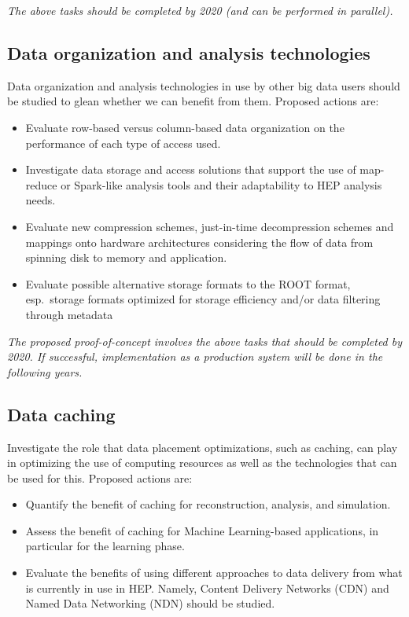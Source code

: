 \documentclass[12pt,a4paper]{article}
\begin{document}
\emph{The above tasks should be completed by 2020 (and can be performed in parallel).}

\subsection{Data organization and analysis
technologies}\label{data-organization-and-analysis}
Data organization and analysis technologies in use by other big data users should be studied
to glean whether we can benefit from them. Proposed actions are:

\begin{itemize}
\item Evaluate row-based versus column-based
  data organization on the performance of each type of access used.
\item Investigate data storage and access solutions that support the use of map-reduce or
Spark-like analysis tools and their adaptability to HEP analysis needs.
\item Evaluate new compression schemes, just-in-time
  decompression schemes and mappings onto hardware architectures
  considering the flow of data from spinning disk to memory and
  application.
\item Evaluate possible alternative storage formats to the ROOT format, esp.\ storage formats optimized for storage efficiency and/or  data filtering through metadata
\end{itemize}

\emph{The proposed proof-of-concept involves the above tasks that should be completed by 2020.
If successful, implementation as a production system will be done in the following years.}

\subsection{Data caching}\label{data-caching}
Investigate the role that data placement optimizations, such as caching, can play in optimizing
the use of computing resources as well as the technologies that can be used for this. Proposed actions are:

\begin{itemize}
\item Quantify the benefit of caching for reconstruction, analysis, and simulation.
\item Assess the benefit of caching for
  Machine Learning-based applications, in particular for the learning
  phase.
\item Evaluate the benefits of using different approaches to data delivery from what is currently in use in HEP.
Namely, Content Delivery Networks (CDN) and Named Data Networking (NDN) should be studied.
\end{itemize}
\end{document}
